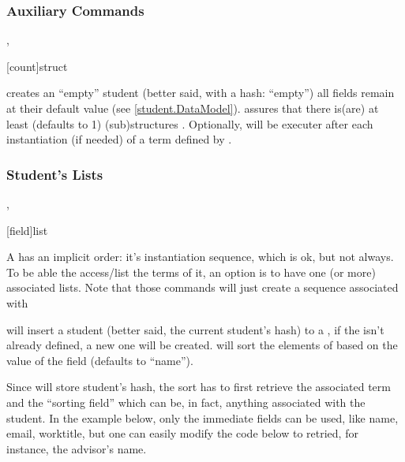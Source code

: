 \documentclass[10pt]{article}
\begin{document}
\subsubsection{Auxiliary Commands}\label{student.auxcmds}
\begin{codedescribe}{\emptytermifnone,\emptyfields}
  \begin{codesyntax}
    \tsmacro{\emptytermifnone}[count]{struct}
    \tsmacro{\emptyfields}{}
  \end{codesyntax}
  \tsobj{\emptyfields} creates an ``empty'' student (better said, with a hash: ``empty'') all fields remain at their default value (see \ref{student.DataModel}). \tsobj{\emptytermifnone} assures that there is(are) at least  (defaults to 1) (sub)structures . Optionally,  will be executer after each instantiation (if needed) of a term defined by .
\end{codedescribe}




\subsubsection{Student's Lists}
\begin{codedescribe}{\studentaddtolist,\studentlistsort}
\begin{codesyntax}
  \tsmacro{\studentlistsort}[field]{list}
\end{codesyntax}
A  has an implicit order: it's instantiation sequence, which is ok, but not always. To be able the access/list the terms of it, an option is to have one (or more) associated lists. Note that those commands will just create a sequence associated with 

\tsobj{\studentaddtolist} will insert a student (better said, the current student's hash) to a , if the  isn't already defined, a new one will be created. \tsobj{\studentlistsort} will sort the elements of  based on the value of the field  (defaults to ``name'').
\end{codedescribe}
\begin{tsremark}
  Since  will store student's hash, the sort has to first retrieve the associated  term and the ``sorting field'' which can be, in fact, anything associated with the student. In the example below, only the immediate fields can be used, like name, email, worktitle, but one can easily modify the code below to retried, for instance, the advisor's name.
\end{tsremark}
\end{document}
